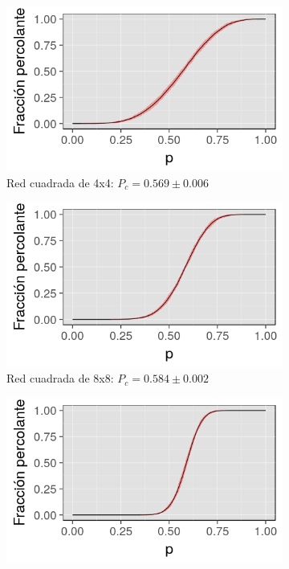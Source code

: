\documentclass[%
 reprint,
 amsmath,amssymb,
 aps,
spanish]{revtex4-1}
\begin{document}
\begin{figure}[h]
\begin{subfigure}{.25\textwidth}
  \centering
  \includegraphics[width=.9\linewidth]{ej1b/4x4}
  \caption{Red cuadrada de 4x4: $P_c=0.569\pm0.006$}
  \label{fig:1ahist}
\end{subfigure}%
\begin{subfigure}{.25\textwidth}
  \centering
  \includegraphics[width=.9\linewidth]{ej1b/8x8}
  \caption{Red cuadrada de 8x8: $P_c=0.584\pm0.002$}
  \label{fig:1ahist}
\end{subfigure}
\begin{subfigure}{.25\textwidth}
  \centering
  \includegraphics[width=.9\linewidth]{ej1b/16x16}

\end{subfigure}
\end{figure}
\end{document}
